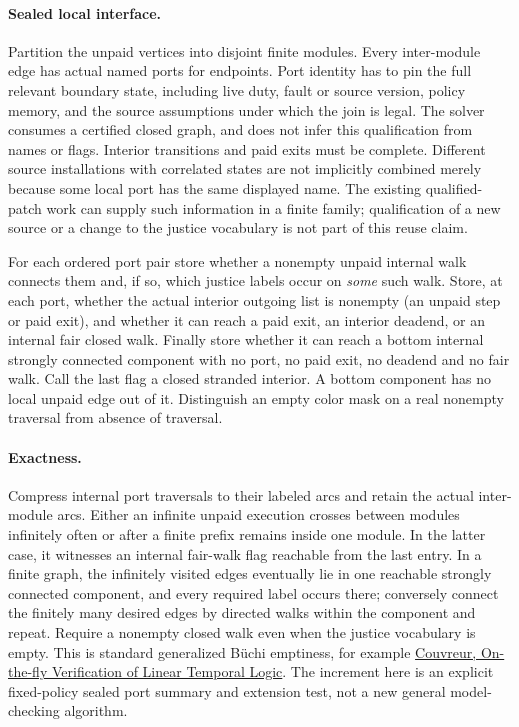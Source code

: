 \documentclass{article}
\begin{document}
\paragraph{Sealed local interface.}
Partition the unpaid vertices into disjoint finite modules. Every
inter-module edge has actual named ports for endpoints. Port identity
has to pin the full relevant boundary state, including live duty,
fault or source version, policy memory, and the source assumptions
under which the join is legal. The solver consumes a certified closed
graph, and does not infer this qualification from names or flags.
Interior transitions and paid exits must be complete. Different source
installations with correlated states are not implicitly combined merely
because some local port has the same displayed name. The existing
qualified-patch work can supply such information in a finite family;
qualification of a new source or a change to the justice vocabulary is
not part of this reuse claim.

For each ordered port pair store whether a nonempty unpaid internal walk
connects them and, if so, which justice labels occur on \emph{some}
such walk. Store, at each port, whether the actual interior outgoing
list is nonempty (an unpaid step or paid exit), and whether it can
reach a paid exit, an interior deadend, or an internal fair closed walk.
Finally store whether it can reach a bottom internal strongly connected
component with no port, no paid exit, no deadend and no fair walk.
Call the last flag a closed stranded interior. A bottom component has
no local unpaid edge out of it. Distinguish an empty color mask on a
real nonempty traversal from absence of traversal.

\paragraph{Exactness.}
Compress internal port traversals to their labeled arcs and retain the
actual inter-module arcs. Either an infinite unpaid execution crosses
between modules infinitely often or after a finite prefix remains inside
one module. In the latter case, it witnesses an internal fair-walk flag
reachable from the last entry. In a finite graph, the infinitely visited
edges eventually lie in one reachable strongly connected component,
and every required label occurs there; conversely connect the finitely
many desired edges by directed walks within the component and repeat.
Require a nonempty closed walk even when the justice vocabulary is empty.
This is standard generalized B\"uchi emptiness, for example
\href{https://www.lrde.epita.fr/dload/spot/bib/couvreur.99.fm.pdf}{Couvreur,
On-the-fly Verification of Linear Temporal Logic}. The increment here is
an explicit fixed-policy sealed port summary and extension test, not a
new general model-checking algorithm.
\end{document}
